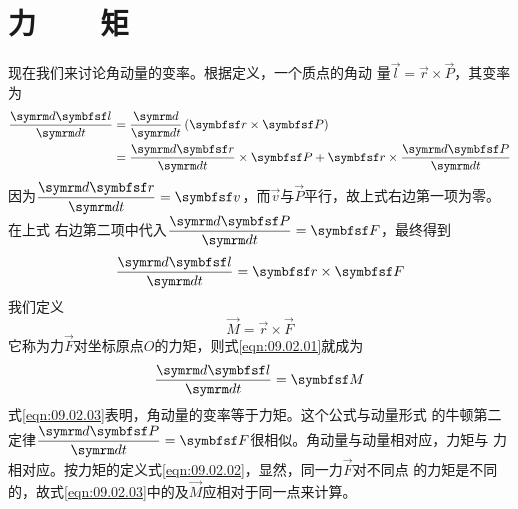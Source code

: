 \section[力矩]{力~~~~矩}\label{sec:09.02}

现在我们来讨论角动量的变率。根据定义，一个质点的角动
量$ \vec{l} = \vec{r} \times \vec{P} $，其变率为
\\
\begin{equation*}
  \begin{split}
    \frac { \dif \vec{l} } { \dif t } &= \frac { \dif } { \dif t } \left( \vec{r} \times \vec{P} \right) \\
    &= \frac { \dif \vec{r} } { \dif t } \times \vec{P} + \vec{r} \times \frac { \dif \vec{P} } { \dif t }
  \end{split}
\end{equation*}
因为$ \dfrac { \dif \vec{r} } { \dif t } = \vec{v} $，而$\vec{v}$与$\vec{P}$平行，故上式右边第一项为零。在上式
右边第二项中代入$\dfrac { \dif \vec{P} } { \dif t } = \vec{F}$，最终得到
\begin{equation}\label{eqn:09.02.01}
  \frac { \dif \vec{l} } { \dif t } = \vec{r} \times \vec{F}
\end{equation}
我们定义
\begin{equation}\label{eqn:09.02.02}
  \vec{M} = \vec{r} \times \vec{F}
\end{equation}
它称为力$\vec{F}$对坐标原点$O$的力矩，则式\eqref{eqn:09.02.01}就成为
\begin{equation}\label{eqn:09.02.03}
  \frac { \dif \vec{l} } { \dif t } = \vec{M}
\end{equation}
式\eqref{eqn:09.02.03}表明，角动量的变率等于力矩。这个公式与动量形式
的牛顿第二定律$ \dfrac { \dif \vec{P} } { \dif t } = \vec{F} $很相似。角动量与动量相对应，力矩与
力相对应。按力矩的定义\lhbrak 式\eqref{eqn:09.02.02}\rhbrak ，显然，同一力$\vec{F}$对不同点
的力矩是不同的，故式\eqref{eqn:09.02.03}中的及$\vec{M}$应相对于同一点来计算。


